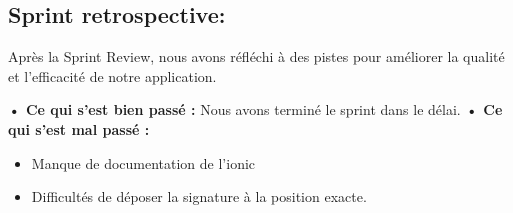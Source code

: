 \subsection{Sprint retrospective:}

Après la Sprint Review, nous avons réfléchi à des pistes pour améliorer la qualité et l'efficacité de notre application.


\noindent\textbf{•	Ce qui s'est bien passé :}
Nous avons terminé le sprint dans le délai.
\noindent\textbf{•	Ce qui s'est mal passé :}
\begin{itemize}
  \item Manque de documentation de l'ionic
  \item Difficultés de déposer la signature à la position exacte.

\end{itemize}

